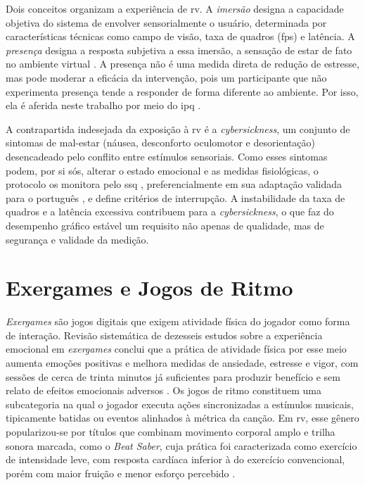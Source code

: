 Dois conceitos organizam a experiência de \gls{rv}. A \emph{imersão} designa a capacidade objetiva do sistema de envolver sensorialmente o usuário, determinada por características técnicas como campo de visão, taxa de quadros (\gls{fps}) e latência. A \emph{presença} designa a resposta subjetiva a essa imersão, a sensação de estar de fato no ambiente virtual \citep{Schubert2001}. A presença não é uma medida direta de redução de estresse, mas pode moderar a eficácia da intervenção, pois um participante que não experimenta presença tende a responder de forma diferente ao ambiente. Por isso, ela é aferida neste trabalho por meio do \gls{ipq} \citep{Schubert2001}.

A contrapartida indesejada da exposição à \gls{rv} é a \textit{cybersickness}, um conjunto de sintomas de mal-estar (náusea, desconforto oculomotor e desorientação) desencadeado pelo conflito entre estímulos sensoriais. Como esses sintomas podem, por si sós, alterar o estado emocional e as medidas fisiológicas, o protocolo os monitora pelo \gls{ssq} \citep{Kennedy1993}, preferencialmente em sua adaptação validada para o português \citep{Goncalves2024}, e define critérios de interrupção. A instabilidade da taxa de quadros e a latência excessiva contribuem para a \textit{cybersickness}, o que faz do desempenho gráfico estável um requisito não apenas de qualidade, mas de segurança e validade da medição.

\section{Exergames e Jogos de Ritmo}\label{sec:fund-exergames}

\textit{Exergames} são jogos digitais que exigem atividade física do jogador como forma de interação. Revisão sistemática de dezesseis estudos sobre a experiência emocional em \textit{exergames} conclui que a prática de atividade física por esse meio aumenta emoções positivas e melhora medidas de ansiedade, estresse e vigor, com sessões de cerca de trinta minutos já suficientes para produzir benefício e sem relato de efeitos emocionais adversos \citep{Marques2023}. Os jogos de ritmo constituem uma subcategoria na qual o jogador executa ações sincronizadas a estímulos musicais, tipicamente batidas ou eventos alinhados à métrica da canção. Em \gls{rv}, esse gênero popularizou-se por títulos que combinam movimento corporal amplo e trilha sonora marcada, como o \textit{Beat Saber}, cuja prática foi caracterizada como exercício de intensidade leve, com resposta cardíaca inferior à do exercício convencional, porém com maior fruição e menor esforço percebido \citep{RubioArias2024}.

